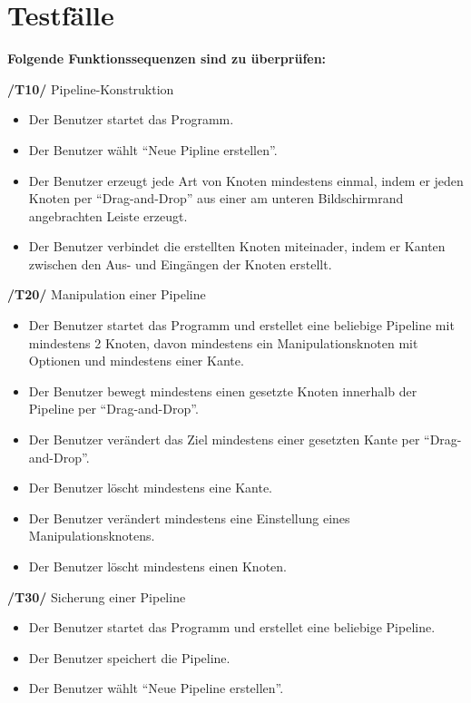 \renewcommand{\labelitemi}{$-$}

\section{Testfälle}

\textbf{Folgende Funktionssequenzen sind zu überprüfen:}
\begin{description}
	\item\textbf{/T10/} Pipeline-Konstruktion
		\begin{itemize}
			\item Der Benutzer startet das Programm.
			\item Der Benutzer wählt ``Neue Pipline erstellen''.
			\item Der Benutzer erzeugt jede Art von Knoten mindestens einmal, indem er jeden Knoten per ``Drag-and-Drop'' aus einer am unteren Bildschirmrand
				angebrachten Leiste erzeugt.
			\item Der Benutzer verbindet die erstellten Knoten miteinader, indem er Kanten zwischen den Aus- und Eingängen der Knoten erstellt.
		\end{itemize}
	\item\textbf{/T20/} Manipulation einer Pipeline
		\begin{itemize}
			\item Der Benutzer startet das Programm und erstellet eine beliebige Pipeline mit mindestens 2 Knoten, davon mindestens ein Manipulationsknoten mit Optionen 
				und mindestens einer Kante.
			\item Der Benutzer bewegt mindestens einen gesetzte Knoten innerhalb der Pipeline per ``Drag-and-Drop''.
			\item Der Benutzer verändert das Ziel mindestens einer gesetzten Kante per ``Drag-and-Drop''.
			\item Der Benutzer löscht mindestens eine Kante.
			\item Der Benutzer verändert mindestens eine Einstellung eines Manipulationsknotens.
			\item Der Benutzer löscht mindestens einen Knoten.
		\end{itemize}
	\item\textbf{/T30/} Sicherung einer Pipeline
		\begin{itemize}
			\item Der Benutzer startet das Programm und erstellet eine beliebige Pipeline.
			\item Der Benutzer speichert die Pipeline.
			\item Der Benutzer wählt ``Neue Pipeline erstellen''.

\end{itemize}
\end{description}
